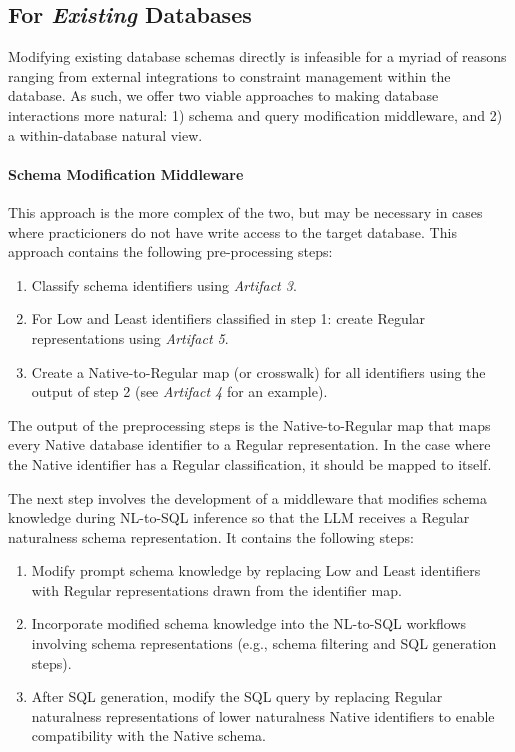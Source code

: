 \subsection{For \emph{Existing} Databases}

Modifying existing database schemas directly is infeasible for a myriad of reasons ranging from external integrations to constraint management within the database.
As such, we offer two viable approaches to making database interactions more natural: 1) schema and query modification middleware, and 2) a within-database natural view.

\paragraph{\textbf{Schema Modification Middleware}}
This approach is the more complex of the two, but may be necessary in cases where practicioners do not have write access to the target database.
This approach contains the following pre-processing steps:
\begin{enumerate}
  \item Classify schema identifiers using \emph{Artifact 3}.
  \item For Low and Least identifiers classified in step 1: create Regular representations using \emph{Artifact 5}.
  \item Create a Native-to-Regular map (or crosswalk) for all identifiers using the output of step 2 (see \emph{Artifact 4} for an example).
\end{enumerate}

The output of the preprocessing steps is the Native-to-Regular map that maps every Native  database identifier to a Regular representation.
In the case where the Native identifier has a Regular classification, it should be mapped to itself.

The next step involves the development of a middleware that modifies schema knowledge during NL-to-SQL inference so that the LLM receives a Regular naturalness schema representation.
It contains the following steps:
\begin{enumerate}
  \item Modify prompt schema knowledge by replacing Low and Least identifiers with Regular representations drawn from the identifier map.
  \item Incorporate modified schema knowledge into the NL-to-SQL workflows involving schema representations (e.g., schema filtering and SQL generation steps).
  \item After SQL generation, modify the SQL query by replacing Regular naturalness representations of lower naturalness Native identifiers to enable compatibility with the Native schema.
\end{enumerate}

